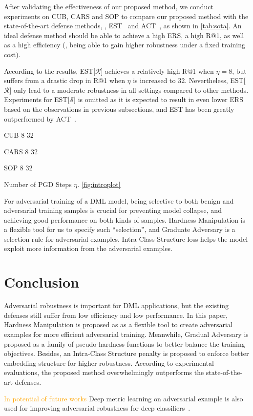 \documentclass[10pt,twocolumn,letterpaper]{article}
\newcommand{\oo}[1]{\textcolor{orange}{#1}}
\begin{document}
After validating the effectiveness of our proposed method, we conduct
experiments on CUB, CARS and SOP to compare our proposed method
with the state-of-the-art defense methods, \ie, EST~\cite{advrank}
and ACT~\cite{robrank}, as shown in \cref{tab:sota}.
%
An ideal defense method should be able to achieve a high ERS, a high R@1,
as well as a high efficiency (\ie, being able to gain higher robustness
under a fixed training cost).

According to the results, EST[$\mathcal{R}$] achieves a relatively high R@1
when $\eta{=}8$, but suffers from a drastic drop in R@1 when $\eta$ is
increased to $32$.
%
Nevertheless, EST[$\mathcal{R}$] only lead to a moderate robustness in all
settings compared to other methods.
%
Experiments for EST[$\mathcal{S}$] is omitted as it is expected to result
in even lower ERS based on the observations in previous subsections, and
EST has been greatly outperformed by ACT~\cite{robrank}.

CUB 8 32

CARS 8 32

SOP 8 32

Number of PGD Steps $\eta$.
\cref{fig:introplot}


\begin{comment}
\begin{figure}[t]
	\texttt{[image: sotaplot.pdf]}
	\caption{sota plot}
\end{figure}
\end{comment}

For adversarial training of a DML model, being selective to both benign and
adversarial training samples is crucial for preventing model collapse, and
achieving good performance on both kinds of samples.
%
Hardness Manipulation is a flexible tool for us to specify such ``selection'',
and Graduate Adversary is a selection rule for adversarial examples.
%
Intra-Class Structure loss helps the model exploit more information from the
adversarial examples.


\section{Conclusion}
\label{sec:5}

Adversarial robustness is important for DML applications, but
the existing defenses still suffer from low efficiency and low
performance.
%
In this paper, 
Hardness Manipulation is proposed as as a flexible tool to create
adversarial examples for more efficient adversarial training.
%
Meanwhile, Gradual Adversary is proposed as a family of pseudo-hardness
functions to better balance the training objectives.
%
Besides, an Intra-Class Structure penalty is proposed to enforce better
embedding structure for higher robustness.
%
According to experimental evaluations, the proposed method overwhelmingly
outperforms the state-of-the-art defenses.

\oo{In potential of future works}
Deep metric learning on adversarial example is also used for improving
adversarial robustness for deep classifiers~\cite{mao2019metric}.

{\small


}


\end{document}
